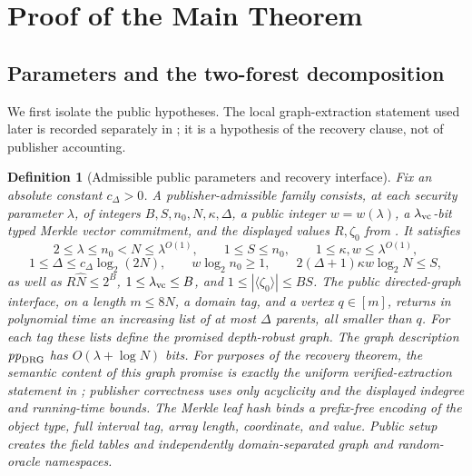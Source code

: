 \documentclass[11pt]{article}
\newtheorem{definition}[lemma]{Definition}
\begin{document}
\section{Proof of the Main Theorem}
\label{sec:main-proof}

\subsection{Parameters and the two-forest decomposition}

We first isolate the public hypotheses.  The local graph-extraction statement
used later is recorded separately in ; it is a
hypothesis of the recovery clause, not of publisher accounting.

\begin{definition}[Admissible public parameters and recovery interface]
\label{def:admissible}
Fix an absolute constant $c_\Delta>0$.
A publisher-admissible family consists, at each security parameter $\lambda$,
of integers $B,\allowbreak S,\allowbreak n_0,\allowbreak N,\allowbreak
\kappa,\allowbreak\Delta$, a public integer $w=w(\lambda)$, a
$\lambda_{\rm vc}$-bit typed Merkle vector commitment, and the displayed
values $R,\zeta_0$ from .  It satisfies
\[
 2\le\lambda\le n_0<N\le\lambda^{O(1)},\qquad
 1\le S\le n_0,\qquad 1\le\kappa,w\le\lambda^{O(1)},
\]
\[
 1\le\Delta\le c_\Delta\log_2(2N),\qquad
 w\log_2n_0\ge1,\qquad
 2(\Delta+1)\kappa w\log_2N\le S,
\tag{1}\label{eq:recovery-validity}
\]
as well as $R\widehat N\le2^B$, $1\le\lambda_{\rm vc}\le B$, and
$1\le|\langle\zeta_0\rangle|\le BS$.  The public
directed-graph interface, on a length $m\le8N$, a domain tag, and a vertex
$q\in[m]$, returns in polynomial time an increasing list of at most $\Delta$
parents, all smaller than $q$.  For each tag these lists define the promised
depth-robust graph.  The graph description $\mathit{pp}_{\rm DRG}$ has
$O(\lambda+\log N)$ bits.
For purposes of the recovery theorem, the semantic content of this graph
promise is exactly the uniform verified-extraction statement in
; publisher correctness uses only acyclicity and the
displayed indegree and running-time bounds.
The Merkle leaf hash binds a prefix-free encoding of the object type, full
interval tag, array length, coordinate, and value.  Public setup creates the
field tables and independently domain-separated graph and random-oracle
namespaces.


\end{definition}
\end{document}
